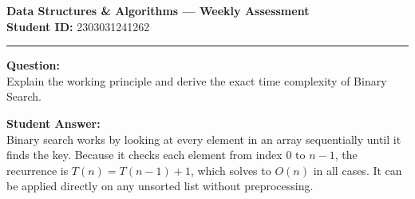 \documentclass[11pt,a4paper]{article}
\begin{document}
\begin{center}
    {\large\bfseries Data Structures \& Algorithms --- Weekly Assessment}\\[0.2cm]
    \textbf{Student ID:} 2303031241262
\end{center}
\hrule
\vspace{0.4cm}

\noindent\textbf{Question:}\\
Explain the working principle and derive the exact time complexity of Binary Search.

\vspace{0.3cm}
\noindent\textbf{Student Answer:}\\
Binary search works by looking at every element in an array sequentially until it finds the key.
Because it checks each element from index 0 to $n-1$, the recurrence is $T(n) = T(n-1) + 1$, which solves to $O(n)$ in all cases.
It can be applied directly on any unsorted list without preprocessing.
\end{document}
